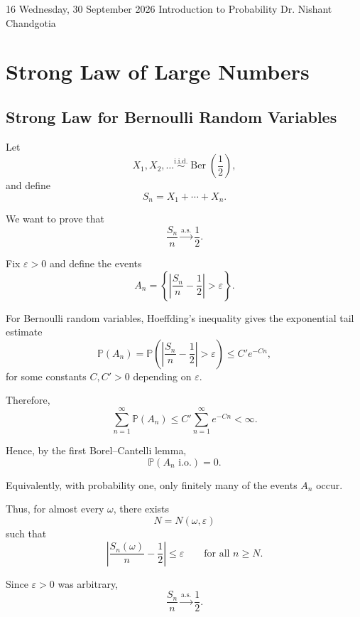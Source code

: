 
\lecture
{16}
{Wednesday, 30 September 2026}
{Introduction to Probability}
{Dr. Nishant Chandgotia}



\section{Strong Law of Large Numbers}

\subsection{Strong Law for Bernoulli Random Variables}

Let
\[
X_1,X_2,\ldots
\overset{\mathrm{i.i.d.}}{\sim}
\operatorname{Ber}\left(\frac12\right),
\]
and define
\[
S_n=X_1+\cdots+X_n.
\]

We want to prove that
\[
\boxed{
\frac{S_n}{n}
\xrightarrow{\mathrm{a.s.}}
\frac12.
}
\]

Fix $\varepsilon>0$ and define the events
\[
A_n
=
\left\{
\left|
\frac{S_n}{n}-\frac12
\right|>\varepsilon
\right\}.
\]

For Bernoulli random variables, Hoeffding's inequality gives the
exponential tail estimate
\[
\mathbb{P}(A_n)
=
\mathbb{P}
\left(
\left|
\frac{S_n}{n}-\frac12
\right|>\varepsilon
\right)
\leq
C'e^{-Cn},
\]
for some constants $C,C'>0$ depending on $\varepsilon$.

Therefore,
\[
\sum_{n=1}^{\infty}\mathbb{P}(A_n)
\leq
C'\sum_{n=1}^{\infty}e^{-Cn}
<\infty.
\]

Hence, by the first Borel--Cantelli lemma,
\[
\boxed{
\mathbb{P}(A_n\text{ i.o.})=0.
}
\]

Equivalently, with probability one, only finitely many of the events
$A_n$ occur.

Thus, for almost every $\omega$, there exists
\[
N=N(\omega,\varepsilon)
\]
such that
\[
\left|
\frac{S_n(\omega)}{n}-\frac12
\right|
\leq\varepsilon
\qquad
\text{for all }n\geq N.
\]

Since $\varepsilon>0$ was arbitrary,
\[
\boxed{
\frac{S_n}{n}
\xrightarrow{\mathrm{a.s.}}
\frac12.
}
\]



